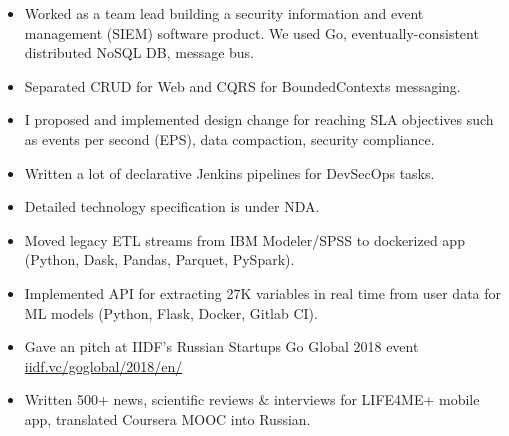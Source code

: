 \documentclass[10pt,a4paper,ragged2e]{altacv}
\begin{document}


\begin{fullwidth}
\makecvheader
\end{fullwidth}




\begin{itemize}
\item
Worked as a team lead building a security information and event management (SIEM) software product. We used Go, eventually-consistent distributed NoSQL DB, message bus.
\item Separated CRUD for Web and CQRS for BoundedContexts messaging.
\item I proposed and implemented design change for reaching SLA objectives such as events per second (EPS), data compaction, security compliance.
\item Written a lot of declarative Jenkins pipelines for DevSecOps tasks.
\item Detailed technology specification is under NDA.
\end{itemize}


\divider

\begin{itemize}
\item Moved legacy ETL streams from IBM Modeler/SPSS to dockerized app (Python, Dask, Pandas, Parquet, PySpark).
\item Implemented API for extracting 27K variables in real time from user data for ML models (Python, Flask, Docker, Gitlab CI).
\item Gave an pitch at IIDF's Russian Startups Go Global 2018 event \url{iidf.vc/goglobal/2018/en/}
\end{itemize}

\divider

\begin{itemize}
\item Written 500+ news, scientific reviews \& interviews for LIFE4ME+ mobile app, translated Coursera MOOC into Russian.
\end{itemize}
\end{document}

